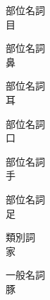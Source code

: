 \item[kuku]
    部位名詞\\
    目
\item[uai]
    部位名詞\\
    鼻
\item[vuvu]
    部位名詞\\
    耳
\item[iatu]
    部位名詞\\
    口
\item[tue]
    部位名詞\\
    手
\item[aopa]
    部位名詞\\
    足
\item[pahai]
    類別詞\\
    家
\item[kuha]
    一般名詞\\
    豚
